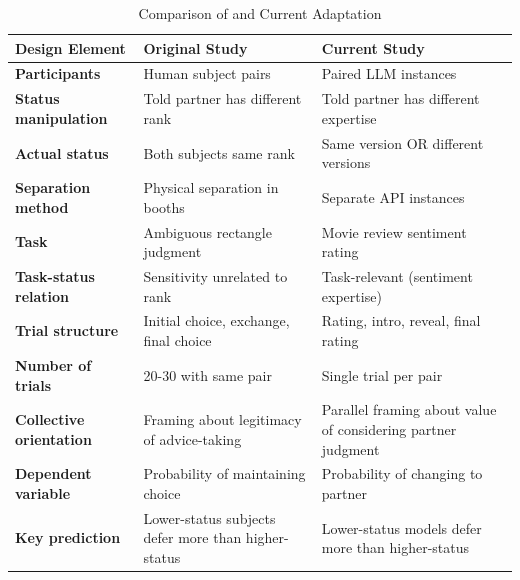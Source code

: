 \begin{table}[htbp]
\centering
\caption{Comparison of \citet{Berger-1972-Status} and Current Adaptation}
\label{tab:comparison}
\small
\begin{tabular}{p{3.5cm}p{5cm}p{5cm}}
\hline
\textbf{Design Element} & \textbf{Original Study} & \textbf{Current Study} \\
\hline
\textbf{Participants} & Human subject pairs & Paired LLM instances \\
\textbf{Status manipulation} & Told partner has different rank & Told partner has different expertise \\
\textbf{Actual status} & Both subjects same rank & Same version OR different versions \\
\textbf{Separation method} & Physical separation in booths & Separate API instances \\
\textbf{Task} & Ambiguous rectangle judgment & Movie review sentiment rating \\
\textbf{Task-status relation} & Sensitivity unrelated to rank & Task-relevant (sentiment expertise) \\
\textbf{Trial structure} & Initial choice, exchange, final choice & Rating, intro, reveal, final rating \\
\textbf{Number of trials} & 20-30 with same pair & Single trial per pair \\
\textbf{Collective orientation} & Framing about legitimacy of advice-taking & Parallel framing about value of considering partner judgment \\
\textbf{Dependent variable} & Probability of maintaining choice & Probability of changing to partner \\
\textbf{Key prediction} & Lower-status subjects defer more than higher-status & Lower-status models defer more than higher-status \\
\hline
\end{tabular}
\end{table}